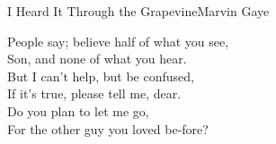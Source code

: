 \begin{song}{I Heard It Through the Grapevine}{Marvin Gaye}

\begin{guitar}
People say; believe half of what you see,\\
Son, and none of what you hear.\\
But I can't help, but be confused,\\
If it's true, please tell me, dear.\\
Do you plan to let me go,\\
For the other guy you loved be-fore?\\
\end{guitar}


\end{song}
